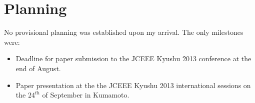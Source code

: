 \section{Planning}
No provisional planning was established upon my arrival. The only milestones were:
\begin{itemize}
\item Deadline for paper submission to the JCEEE Kyushu 2013 conference \cite{jceeeKyushuWebsite} at the end of August.
\item Paper presentation at the the JCEEE Kyushu 2013 international sessions on the $24^{th}$ of September in Kumamoto.
\end{itemize}